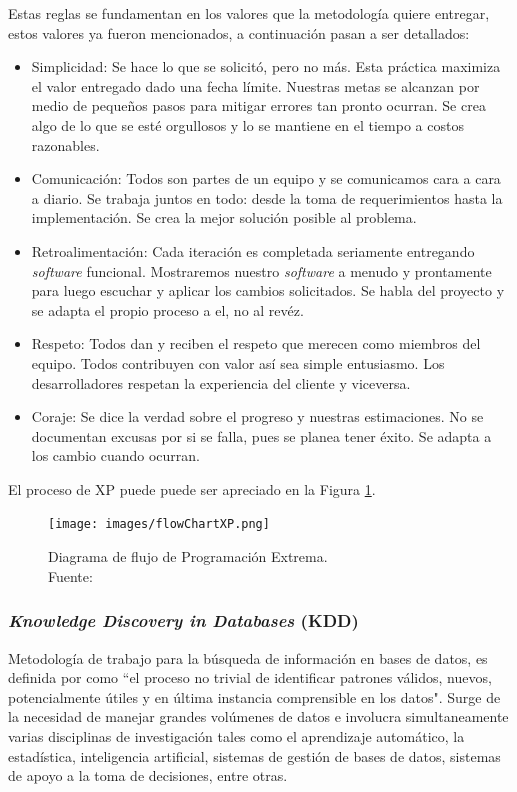 Estas reglas se fundamentan en los valores que la metodología quiere entregar, estos valores ya fueron mencionados, a continuación pasan a ser detallados:

\begin{itemize}
\item Simplicidad: Se hace lo que se solicitó, pero no más. Esta práctica maximiza el valor entregado dado una fecha límite. Nuestras metas se alcanzan por medio de pequeños pasos para mitigar errores tan pronto ocurran. Se crea algo de lo que se esté orgullosos y lo se mantiene en el tiempo a costos razonables.
\item Comunicación: Todos son partes de un equipo y se comunicamos cara a cara a diario. Se trabaja juntos en todo: desde la toma de requerimientos hasta la implementación. Se crea la mejor solución posible al problema.
\item Retroalimentación: Cada iteración es completada seriamente entregando \textit{software} funcional. Mostraremos nuestro \textit{software} a menudo y prontamente para luego escuchar y aplicar los cambios solicitados. Se habla del proyecto y se adapta el propio proceso a el, no al revéz.
\item Respeto: Todos dan y reciben el respeto que merecen como miembros del equipo. Todos contribuyen con valor así sea simple entusiasmo. Los desarrolladores respetan la experiencia del cliente y viceversa. 
\item Coraje: Se dice la verdad sobre el progreso y nuestras estimaciones. No se documentan excusas por si se falla, pues se planea tener éxito. Se adapta a los cambio cuando ocurran.
\end{itemize}

El proceso de XP puede puede ser apreciado en la Figura \ref{fig:procesoXP}.

\begin{figure}[H]
	\centering
	\captionsetup{justification=centering}
	\texttt{[image: images/flowChartXP.png]}
	\caption[Diagrama de flujo de Programación Extrema.]{Diagrama de flujo de Programación Extrema.\\Fuente: \cite{XP}}
	\label{fig:procesoXP}
\end{figure}

\subsubsection*{\textit{Knowledge Discovery in Databases} (KDD)}
\label{subsubsec:kdd}

Metodología de trabajo para la búsqueda de información en bases de datos, es definida por \cite{KDDFayyad} como ``el proceso no trivial de identificar patrones válidos, nuevos, potencialmente útiles y en última instancia comprensible en los datos". Surge de la necesidad de manejar grandes volúmenes de datos e involucra simultaneamente varias disciplinas de investigación tales como el aprendizaje automático, la estadística, inteligencia artificial, sistemas de gestión de bases de datos, sistemas de apoyo a la toma de decisiones, entre otras.

